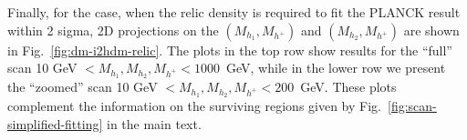 \documentclass[12pt,a4paper]{article}
\begin{document}

Finally, for the case, when the relic density is required to fit the PLANCK result within 2 sigma,
 2D projections on the $(M_{h_1}, M_{h^+})$ and $(M_{h_2}, M_{h^+})$ are shown in Fig.~\ref{fig:dm-i2hdm-relic}. The plots in the top row show results for the ``full'' scan 
10 GeV $< M_{h_1}, M_{h_2}, M_{h^{+}} < 1000$~GeV, while in the lower row we present the ``zoomed'' scan 10 GeV $< M_{h_1}, M_{h_2}, M_{h^{+}} < 200$~GeV.
These plots complement the information on the surviving regions given by Fig.~\ref{fig:scan-simplified-fitting}
in the main text.






\end{document}
